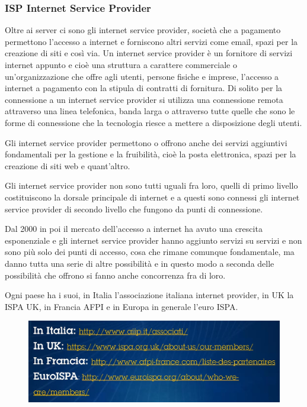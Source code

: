 \subsubsection{ISP Internet Service Provider}
Oltre ai server ci sono gli internet service provider, società che a pagamento permettono l'accesso a internet e forniscono altri servizi come email, spazi per la creazione di siti e così via. Un internet service provider è un fornitore di servizi internet appunto e cioè una struttura a carattere commerciale o un'organizzazione che offre agli utenti, persone fisiche e imprese, l'accesso a internet a pagamento con la stipula di contratti di fornitura. Di solito per la connessione a un internet service provider si utilizza una connessione remota attraverso una linea telefonica, banda larga o attraverso tutte quelle che sono le forme di connessione che la tecnologia riesce a mettere a disposizione degli utenti. \par
Gli internet service provider permettono o offrono anche dei servizi aggiuntivi fondamentali per la gestione e la fruibilità, cioè la posta elettronica, spazi per la creazione di siti web e quant'altro. \par
Gli internet service provider non sono tutti uguali fra loro, quelli di primo livello costituiscono la dorsale principale di internet e a questi sono connessi gli internet service provider di secondo livello che fungono da punti di connessione.\par
Dal 2000 in poi il mercato dell'accesso a internet ha avuto una crescita esponenziale e gli internet service provider hanno aggiunto servizi su servizi e non sono più solo dei punti di accesso, cosa che rimane comunque fondamentale, ma  danno tutta una serie di altre possibilità e in questo modo a seconda delle possibilità che offrono si fanno anche concorrenza fra di loro.\par
Ogni paese ha i suoi, in Italia l'associazione italiana internet provider, in UK la ISPA UK, in Francia AFPI e in Europa in generale l'euro ISPA. \par

\begin{figure}
    \centering
    \includegraphics[width=1\linewidth]{images/03_lez_fig_04.jpg}

\end{figure}


